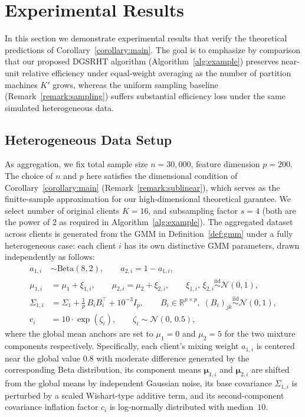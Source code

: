 \documentclass[11pt]{article}
\numberwithin{equation}{section}
\theoremstyle{plain}
\theoremstyle{definition}
\theoremstyle{remark}
\begin{document}
\section{Experimental Results}

In this section we demonstrate experimental results that verify the theoretical predictions of Corollary~\ref{corollary:main}. The goal is to emphasize by comparison that our proposed DGSRHT algorithm (Algorithm~\ref{alg:example}) preserves near-unit relative efficiency under equal-weight averaging as the number of partition machines $K'$ grows, whereas the uniform sampling baseline (Remark~\ref{remark:sampling}) suffers substantial efficiency loss under the same simulated heterogeneous data.

\subsection{Heterogeneous Data Setup}
\label{sec:setup}

As aggregation, we fix total sample size $n=30{,}000$, feature dimension $p=200$. The choice of $n$ and $p$ here satisfies the dimensional condition of Corollary~\ref{corollary:main} (Remark~\ref{remark:sublinear}), which serves as the finitte-sample approximation for our high-dimensional theoretical garantee. We select number of original clients $K=16$, and subsampling factor $s=4$ (both are the power of 2 as required in Algorithm~\ref{alg:example}). The aggregated dataset across clients is generated from the GMM in Definition~\ref{def:gmm} under a fully heterogeneous case: each client $i$ has its own distinctive GMM parameters, drawn independently as follows:
\begin{align}
  a_{1,i} &\sim \mathrm{Beta}(8,2),
    \qquad a_{2,i} = 1 - a_{1,i}, \nonumber\\[3pt]
  \mu_{1,i} &= \mu_1 + \xi_{1,i},
    \qquad \mu_{2,i} = \mu_2 + \xi_{2,i},
    \qquad \xi_{1,i},\,\xi_{2,i}\overset{\mathrm{iid}}{\sim}\mathcal{N}(0,1),
    \nonumber\\[3pt]
  \Sigma_{1,i} &= \Sigma_1 + \tfrac{1}{p}\,B_i B_i^{\top} + 10^{-3}I_p,
    \qquad B_i\in\mathbb{R}^{p\times p},\;
    (B_i)_{jk}\overset{\mathrm{iid}}{\sim}\mathcal{N}(0,1),
    \nonumber\\[3pt]
  c_i &= 10\cdot\exp(\zeta_i),
    \qquad \zeta_i\sim\mathcal{N}(0,\,0.5),
    \nonumber
\end{align}
where the global mean anchors are set to $\mu_1=0$ and $\mu_2=5$ for the two mixture components respectively. Specifically, each client's mixing weight $a_{1,i}$ is centered near the global value $0.8$ with moderate difference generated by the corresponding Beta distribution, its component means $\boldsymbol\mu_{1,i}$ and $\boldsymbol\mu_{2,i}$ are shifted from the global means by independent Gaussian noise, its base covariance $\Sigma_{1,i}$ is perturbed by a scaled Wishart-type additive term, and its second-component covariance inflation factor $c_i$ is log-normally distributed with median~$10$.
\end{document}
